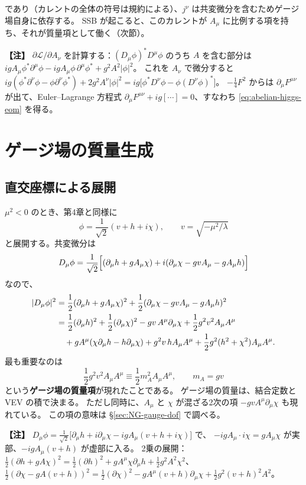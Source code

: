 \documentclass[uplatex,dvipdfmx,a4paper,11pt,openany]{jsbook}
\newenvironment{note}{\vspace{1ex}\par\footnotesize\noindent\textbf{【注】}}{\par\vspace{1ex}}
\numberwithin{equation}{chapter}
\theoremstyle{definition}
\theoremstyle{plain}
\theoremstyle{remark}
\newcommand{\Lag}{\mathcal{L}}
\begin{document}
であり（カレントの全体の符号は規約による）、$j^\nu$ は共変微分を含むためゲージ場自身に依存する。
SSB が起こると、このカレントが $A_\mu$ に比例する項を持ち、それが質量項として働く（次節）。
\begin{note}
$\partial\Lag/\partial A_\nu$ を計算する：$(D_\mu\phi)^*D^\mu\phi$ のうち $A$ を含む部分は
$ig A_\mu\phi^*\partial^\mu\phi-igA_\mu\phi\,\partial^\mu\phi^*+g^2A^2|\phi|^2$。
これを $A_\nu$ で微分すると $ig(\phi^*\partial^\nu\phi-\phi\partial^\nu\phi^*)+2g^2A^\nu|\phi|^2
=ig\bigl[\phi^*D^\nu\phi-\phi(D^\nu\phi)^*\bigr]$。
$-\frac14F^2$ からは $\partial_\mu F^{\mu\nu}$ が出て、Euler--Lagrange 方程式 $\partial_\mu F^{\mu\nu}+ig[\cdots]=0$、すなわち \eqref{eq:abelian-higgs-eom} を得る。
\end{note}
\section{ゲージ場の質量生成}
\label{sec:gauge-mass}
\subsection{直交座標による展開}
$\mu^2<0$ のとき、第4章と同様に
\begin{equation}
\phi=\frac{1}{\sqrt2}(v+h+i\chi),\qquad v=\sqrt{-\mu^2/\lambda}
\end{equation}
と展開する。共変微分は
\begin{equation}
D_\mu\phi=\frac{1}{\sqrt2}\Bigl[(\partial_\mu h+gA_\mu\chi)+i(\partial_\mu\chi-gvA_\mu-gA_\mu h)\Bigr]
\end{equation}
なので、
\begin{align}
|D_\mu\phi|^2
&=\frac12(\partial_\mu h+gA_\mu\chi)^2+\frac12(\partial_\mu\chi-gvA_\mu-gA_\mu h)^2 \notag\\
&=\frac12(\partial_\mu h)^2+\frac12(\partial_\mu\chi)^2
-gv\,A^\mu\partial_\mu\chi+\frac12g^2v^2A_\mu A^\mu \notag\\
&\quad+gA^\mu(\chi\partial_\mu h-h\partial_\mu\chi)+g^2v\,hA_\mu A^\mu+\frac12g^2(h^2+\chi^2)A_\mu A^\mu .
\label{eq:abelian-higgs-cartesian}
\end{align}
最も重要なのは
\begin{equation}
\frac12g^2v^2A_\mu A^\mu\equiv\frac12m_A^2A_\mu A^\mu,\qquad m_A=gv
\label{eq:mA}
\end{equation}
という\textbf{ゲージ場の質量項}が現れたことである。
ゲージ場の質量は、結合定数と VEV の積で決まる。
ただし同時に、$A_\mu$ と $\chi$ が混ざる2次の項 $-gvA^\mu\partial_\mu\chi$ も現れている。
この項の意味は \S\ref{sec:NG-gauge-dof} で調べる。
\begin{note}
$D_\mu\phi=\frac{1}{\sqrt2}\bigl[\partial_\mu h+i\partial_\mu\chi-igA_\mu(v+h+i\chi)\bigr]$ で、
$-igA_\mu\cdot i\chi=gA_\mu\chi$ が実部、$-igA_\mu(v+h)$ が虚部に入る。
2乗の展開：$\frac12(\partial h+gA\chi)^2=\frac12(\partial h)^2+gA^\mu\chi\partial_\mu h+\frac12g^2A^2\chi^2$、
$\frac12(\partial\chi-gA(v+h))^2=\frac12(\partial\chi)^2-gA^\mu(v+h)\partial_\mu\chi+\frac12g^2(v+h)^2A^2$。
\end{note}
\end{document}
